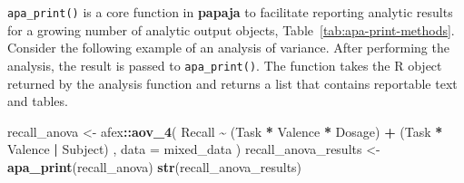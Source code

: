 \documentclass[
  english,
  ,man,floatsintext]{apa6}
\newenvironment{Shaded}{\begin{snugshade}}{\end{snugshade}}
\newcommand{\AttributeTok}[1]{\textcolor[rgb]{0.13,0.29,0.53}{#1}}
\newcommand{\FunctionTok}[1]{\textcolor[rgb]{0.13,0.29,0.53}{\textbf{#1}}}
\newcommand{\NormalTok}[1]{#1}
\newcommand{\OtherTok}[1]{\textcolor[rgb]{0.56,0.35,0.01}{#1}}
\newcommand{\SpecialCharTok}[1]{\textcolor[rgb]{0.81,0.36,0.00}{\textbf{#1}}}
\begin{document}
\texttt{apa\_print()} is a core function in \textbf{papaja} to facilitate reporting analytic results for a growing number of analytic output objects, Table~\ref{tab:apa-print-methods}.
Consider the following example of an analysis of variance.
After performing the analysis, the result is passed to \texttt{apa\_print()}.
The function takes the R object returned by the analysis function and returns a list that contains reportable text and tables.

\begin{Shaded}
\begin{Highlighting}[]
\NormalTok{recall\_anova }\OtherTok{\textless{}{-}}\NormalTok{ afex}\SpecialCharTok{::}\FunctionTok{aov\_4}\NormalTok{(}
\NormalTok{  Recall }\SpecialCharTok{\textasciitilde{}}\NormalTok{ (Task }\SpecialCharTok{*}\NormalTok{ Valence }\SpecialCharTok{*}\NormalTok{ Dosage) }\SpecialCharTok{+}\NormalTok{ (Task }\SpecialCharTok{*}\NormalTok{ Valence }\SpecialCharTok{|}\NormalTok{ Subject)}
\NormalTok{  , }\AttributeTok{data =}\NormalTok{ mixed\_data}
\NormalTok{)}
\NormalTok{recall\_anova\_results }\OtherTok{\textless{}{-}} \FunctionTok{apa\_print}\NormalTok{(recall\_anova)}
\FunctionTok{str}\NormalTok{(recall\_anova\_results)}
\end{Highlighting}
\end{Shaded}
\end{document}
